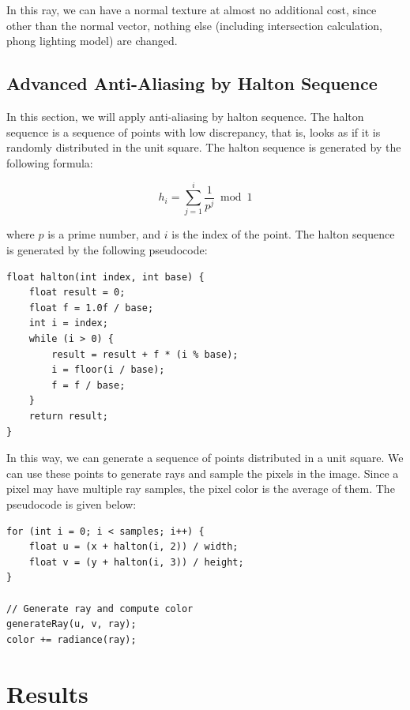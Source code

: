 \documentclass[acmtog]{acmart}
\begin{document}
In this ray, we can have a normal texture at almost no additional cost, since other than the normal vector, nothing else (including intersection calculation, phong lighting model) are changed.

\subsection{Advanced Anti-Aliasing by Halton Sequence}

In this section, we will apply anti-aliasing by halton sequence.
The halton sequence is a sequence of points with low discrepancy, that is, looks as if it is randomly distributed in the unit square. The halton sequence is generated by the following formula:

\begin{equation}
	h_i = \sum_{j=1}^i \frac{1}{p^j} \bmod 1
\end{equation}

where $p$ is a prime number, and $i$ is the index of the point. The halton sequence is generated by the following pseudocode:

\begin{lstlisting}
float halton(int index, int base) {
	float result = 0;
	float f = 1.0f / base;
	int i = index;
	while (i > 0) {
		result = result + f * (i % base);
		i = floor(i / base);
		f = f / base;
	}
	return result;
}
\end{lstlisting}

In this way, we can generate a sequence of points distributed in a unit square. We can use these points to generate rays and sample the pixels in the image. Since a pixel may have multiple ray samples, the pixel color is the average of them. The pseudocode is given below:

\begin{lstlisting}
for (int i = 0; i < samples; i++) {
	float u = (x + halton(i, 2)) / width;
	float v = (y + halton(i, 3)) / height;
}

// Generate ray and compute color
generateRay(u, v, ray);
color += radiance(ray);
\end{lstlisting}

\newpage

\section{Results}

\end{document}
